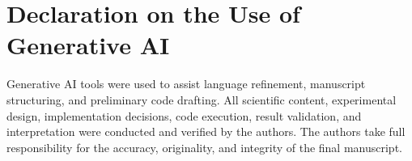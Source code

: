 \section*{Declaration on the Use of Generative AI}

Generative AI tools were used to assist language refinement, manuscript structuring, and preliminary code drafting. All scientific content, experimental design, implementation decisions, code execution, result validation, and interpretation were conducted and verified by the authors. The authors take full responsibility for the accuracy, originality, and integrity of the final manuscript.
